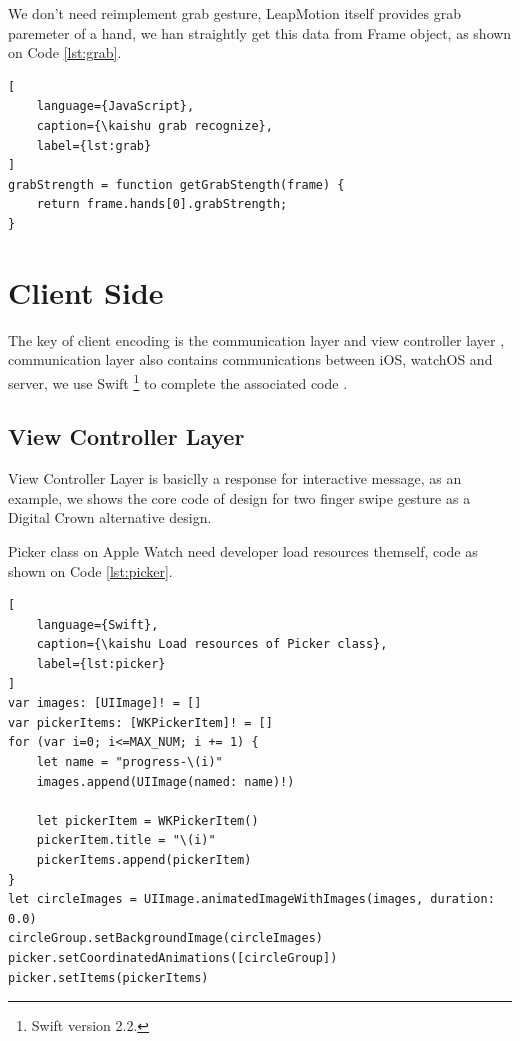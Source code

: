 We don't need reimplement grab gesture, LeapMotion itself provides grab paremeter of a hand, we han straightly get this data from Frame object, as shown on Code \ref{lst:grab}.

\begin{lstlisting}[
    language={JavaScript},
    caption={\kaishu grab recognize},
    label={lst:grab}
]
grabStrength = function getGrabStength(frame) {
    return frame.hands[0].grabStrength;
}
\end{lstlisting}

\section{Client Side}

The key of client encoding is the communication layer and view controller layer , communication layer also contains communications between iOS, watchOS and server, we use Swift \footnote{Swift version 2.2.} to complete the associated code \cite{swift2015, swiftoc2015}.

\subsection{View Controller Layer}

View Controller Layer is basiclly a response for interactive message, as an example, we shows the core code of design for two finger swipe gesture as a Digital Crown alternative design.

Picker class on Apple Watch need developer load resources themself, code as shown on Code \ref{lst:picker}.

\begin{lstlisting}[
    language={Swift},
    caption={\kaishu Load resources of Picker class},
    label={lst:picker}
]
var images: [UIImage]! = []
var pickerItems: [WKPickerItem]! = []
for (var i=0; i<=MAX_NUM; i += 1) {
    let name = "progress-\(i)"
    images.append(UIImage(named: name)!)

    let pickerItem = WKPickerItem()
    pickerItem.title = "\(i)"
    pickerItems.append(pickerItem)
}
let circleImages = UIImage.animatedImageWithImages(images, duration: 0.0)
circleGroup.setBackgroundImage(circleImages)
picker.setCoordinatedAnimations([circleGroup])
picker.setItems(pickerItems)
\end{lstlisting}

